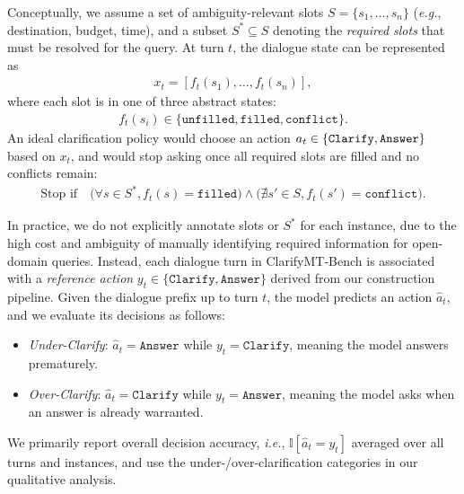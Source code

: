 \documentclass[sigconf]{acmart}
\newcommand{\dataset}{ClarifyMT-Bench\xspace}
\begin{document}
Conceptually, we assume a set of ambiguity-relevant slots $S = \{s_1, \dots, s_n\}$ (\textit{e.g.}, destination, budget, time), and a subset $S^* \subseteq S$ denoting the \emph{required slots} that must be resolved for the query. At turn $t$, the dialogue state can be represented as
\begin{align}
    x_t = [f_t(s_1), \dots, f_t(s_n)],
\end{align}
where each slot is in one of three abstract states:
\begin{align}
    f_t(s_i) \in \{\texttt{unfilled}, \texttt{filled}, \texttt{conflict}\}.
\end{align}
An ideal clarification policy would choose an action $a_t \in \{\texttt{Clarify}, \\\texttt{Answer}\}$ based on $x_t$, and would stop asking once all required slots are filled and no conflicts remain:
\begin{align}
    \text{Stop if} \quad \Big( \forall s \in S^*, f_t(s) = \texttt{filled} \Big) \land \Big( \nexists s' \in S, f_t(s') = \texttt{conflict} \Big).
    \label{eq:stopping}
\end{align}

In practice, we do not explicitly annotate slots or $S^*$ for each instance, due to the high cost and ambiguity of manually identifying required information for open-domain queries.
Instead, each dialogue turn in \dataset{} is associated with a \emph{reference action} $y_t \in \{\texttt{Clarify}, \texttt{Answer}\}$ derived from our construction pipeline. 
Given the dialogue prefix up to turn $t$, the model predicts an action $\hat{a}_t$, and we evaluate its decisions as follows:
\begin{itemize}[leftmargin=1.2em]
    \item \emph{Under-Clarify}: $\hat{a}_t = \texttt{Answer}$ while $y_t = \texttt{Clarify}$, meaning the model answers prematurely.
    \item \emph{Over-Clarify}: $\hat{a}_t = \texttt{Clarify}$ while $y_t = \texttt{Answer}$, meaning the model asks when an answer is already warranted.
\end{itemize}

We primarily report overall decision accuracy, \textit{i.e.}, $\mathbb{I}[\hat{a}_t = y_t]$ averaged over all turns and instances, and use the under-/over-clarification categories in our qualitative analysis.




\end{document}
